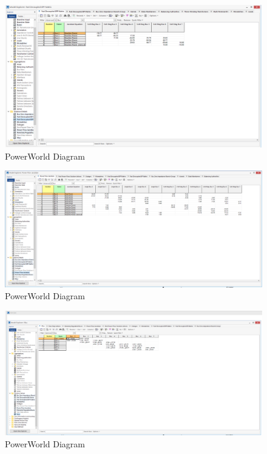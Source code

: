 \documentclass[12pt]{article}
\begin{document}
        \begin{figure}[H]
            \centerline{\includegraphics[scale=0.3]{images/PowerWorldTable7}}
            \caption{PowerWorld Diagram}
        \end{figure}
        \begin{figure}[H]
            \centerline{\includegraphics[scale=0.3]{images/PowerWorldTable8}}
            \caption{PowerWorld Diagram}
        \end{figure}
        \begin{figure}[H]
            \centerline{\includegraphics[scale=0.3]{images/PowerWorldTable9}}
            \caption{PowerWorld Diagram}
        \end{figure}
    
\end{document}
